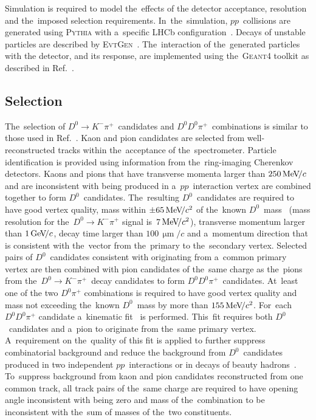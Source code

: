\documentclass[12pt,a4paper]{article}
\def\lhcb   {\mbox{LHCb}\xspace}
\def\Ppi         {\ensuremath{\uppi}\xspace}
\def\PD      {\ensuremath{\mathrm{D}}\xspace}
\def\PK      {\ensuremath{\mathrm{K}}\xspace}
\def\Pp      {\ensuremath{\mathrm{p}}\xspace}
\def\Ppi         {\ensuremath{\pi}\xspace}
\def\PD      {\ensuremath{D}\xspace}
\def\PK      {\ensuremath{K}\xspace}
\def\Pp      {\ensuremath{p}\xspace}
\def\pion   {{\ensuremath{\Ppi}}\xspace}
\def\pip    {{\ensuremath{\pion^+}}\xspace}
\def\kaon    {{\ensuremath{\PK}}\xspace}
\def\Km      {{\ensuremath{\kaon^-}}\xspace}
\def\D       {{\ensuremath{\PD}}\xspace}
\def\Dz      {{\ensuremath{\D^0}}\xspace}
\def\proton      {{\ensuremath{\Pp}}\xspace}
\newcommand{\decay}[2]{\ensuremath{#1\!\to #2}\xspace}
\def\to                 {\ensuremath{\rightarrow}\xspace}
\newcommand{\nospaceunit}[1]{\ensuremath{\text{#1}}}
\newcommand{\aunit}[1]{\ensuremath{\text{\,#1}}}
\newcommand{\mevc}{\ensuremath{\aunit{Me\kern -0.1em V\!/}c}\xspace}
\newcommand{\gevc}{\ensuremath{\aunit{Ge\kern -0.1em V\!/}c}\xspace}
\newcommand{\mevcc}{\ensuremath{\aunit{Me\kern -0.1em V\!/}c^2}\xspace}
\def\mum  {\ensuremath{\,\upmu\nospaceunit{m}}\xspace}
\def\evtgen     {\mbox{\textsc{EvtGen}}\xspace}
\def\geant      {\mbox{\textsc{Geant4}}\xspace}
\def\pythia     {\mbox{\textsc{Pythia}}\xspace}
\begin{document}
Simulation is required to model 
the~effects of the detector acceptance,
resolution and the~imposed selection requirements.
In~the~simulation, 
$\proton\proton$~collisions are generated using
  \pythia with a~specific \lhcb configuration~\cite{LHCb-PROC-2010-056}.
  Decays of unstable particles
  are described by \evtgen~\cite{Lange:2001uf}.
The~interaction of the~generated particles with the detector, and its response,
  are implemented using the~\geant
  toolkit as described in
  Ref.~\cite{LHCb-PROC-2011-006}. 

\subsection*{Selection}
The~selection 
of \mbox{$\decay{\Dz}{\Km\pip}$}~candidates
and \mbox{$\Dz\Dz\pip$}~combinations 
is similar to those used in 
Ref.~\cite{LHCb-PAPER-2012-003}.
Kaon and  pion candidates  are selected from 
well\nobreakdash-reconstructed tracks
within the~acceptance of the~spectrometer.
Particle identification 
is provided using information from
the~ring\nobreakdash-imaging 
Cherenkov detectors.
Kaons and pions that have transverse 
momenta larger than $250\mevc$ 
and are inconsistent with being produced 
in a~$\proton\proton$~interaction 
vertex are combined together to form $\Dz$~candidates.
The~resulting $\Dz$~candidates are 
required to have 
good vertex quality,
mass within $\pm 65\mevcc$ 
of the~known \Dz~mass~\cite{PDG2021}
(mass resolution for the~\mbox{$\decay{\Dz}{\Km\pip}$}
signal is~7\mevcc), 
transverse momentum larger than $1\gevc$, 
decay time larger than $100\mum/c$ and 
a~momentum  direction that is consistent 
with the~vector from the~primary to 
the~secondary vertex. 
Selected pairs of \Dz~candidates consistent 
with originating from a~common primary vertex 
are then combined with 
pion candidates of the~same  charge 
as the~pions from 
the~\mbox{$\decay{\Dz}{\Km\pip}$}~decay
candidates  to 
form $\Dz\Dz\pip$~candidates. 
At~least one of the two $\Dz\pip$ 
combinations is required to 
have good vertex quality and mass 
not exceeding the~known 
$\Dz$~mass by more than $155\mevcc$.
For~each~$\Dz\Dz\pip$ candidate 
a~kinematic fit~\cite{Hulsbergen:2005pu} 
is performed.
This~fit 
requires both $\Dz$~candidates and a~pion  
to originate from the~same primary vertex.
A~requirement on the~quality
of this fit is applied to further 
suppress combinatorial background 
and reduce the background from $\Dz$~candidates 
produced in two independent 
$\proton\proton$~interactions 
or in decays of 
beauty hadrons~\cite{LHCb-PAPER-2012-003}.
To~suppress background from kaon 
and pion candidates reconstructed from 
one common track,
all track pairs of the~same charge are required to have 
opening angle inconsistent with being zero 
and mass of the~combination to be inconsistent 
with the~sum of masses of the~two constituents.
\end{document}
